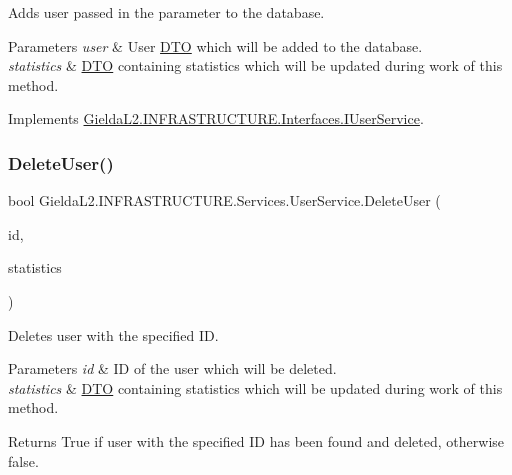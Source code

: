Adds user passed in the parameter to the database. 


\begin{DoxyParams}{Parameters}
{\em user} & User \mbox{\hyperlink{namespace_gielda_l2_1_1_i_n_f_r_a_s_t_r_u_c_t_u_r_e_1_1_d_t_o}{D\+TO}} which will be added to the database.\\
\hline
{\em statistics} & \mbox{\hyperlink{namespace_gielda_l2_1_1_i_n_f_r_a_s_t_r_u_c_t_u_r_e_1_1_d_t_o}{D\+TO}} containing statistics which will be updated during work of this method.\\
\hline
\end{DoxyParams}


Implements \mbox{\hyperlink{interface_gielda_l2_1_1_i_n_f_r_a_s_t_r_u_c_t_u_r_e_1_1_interfaces_1_1_i_user_service_a964c730457bbce497d33fed5fda0b103}{Gielda\+L2.\+I\+N\+F\+R\+A\+S\+T\+R\+U\+C\+T\+U\+R\+E.\+Interfaces.\+I\+User\+Service}}.

\mbox{\label{class_gielda_l2_1_1_i_n_f_r_a_s_t_r_u_c_t_u_r_e_1_1_services_1_1_user_service_ae318cd1c42a95c89d736e3dc1151dddc}} 
\subsubsection{\texorpdfstring{DeleteUser()}{DeleteUser()}}
{\footnotesize\ttfamily bool Gielda\+L2.\+I\+N\+F\+R\+A\+S\+T\+R\+U\+C\+T\+U\+R\+E.\+Services.\+User\+Service.\+Delete\+User (\begin{DoxyParamCaption}\item[{int}]{id,  }\item[{\mbox{\hyperlink{class_gielda_l2_1_1_i_n_f_r_a_s_t_r_u_c_t_u_r_e_1_1_d_t_o_1_1_statistics_d_t_o}{Statistics\+D\+TO}}}]{statistics }\end{DoxyParamCaption})}



Deletes user with the specified ID. 


\begin{DoxyParams}{Parameters}
{\em id} & ID of the user which will be deleted.\\
\hline
{\em statistics} & \mbox{\hyperlink{namespace_gielda_l2_1_1_i_n_f_r_a_s_t_r_u_c_t_u_r_e_1_1_d_t_o}{D\+TO}} containing statistics which will be updated during work of this method.\\
\hline
\end{DoxyParams}
\begin{DoxyReturn}{Returns}
True if user with the specified ID has been found and deleted, otherwise false.
\end{DoxyReturn}


